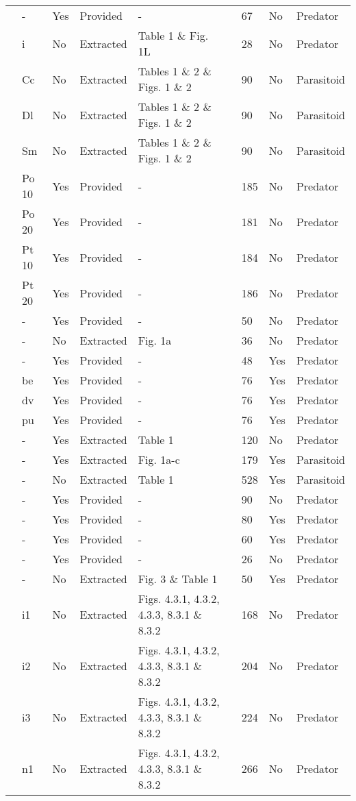 \begin{longtable}{lllllllll}
\citet{Kratina:2009aa}&-&Yes&Provided&-&\citet{Kratina:2020aa}&67&No&Predator\tabularnewline
\citet{Krylov:1992aa}&i&No&Extracted&Table 1 \& Fig. 1L&\citet{Novak:2020aa}&28&No&Predator\tabularnewline
\citet{Kumar:1985aa}&Cc&No&Extracted&Tables 1 \& 2 \& Figs. 1 \& 2&\citet{Novak:2020aa}&90&No&Parasitoid\tabularnewline
\citet{Kumar:1985aa}&Dl&No&Extracted&Tables 1 \& 2 \& Figs. 1 \& 2&\citet{Novak:2020aa}&90&No&Parasitoid\tabularnewline
\citet{Kumar:1985aa}&Sm&No&Extracted&Tables 1 \& 2 \& Figs. 1 \& 2&\citet{Novak:2020aa}&90&No&Parasitoid\tabularnewline
\citet{Lang:2012aa}&Po 10&Yes&Provided&-&\citet{Lang:2020aa}&185&No&Predator\tabularnewline
\citet{Lang:2012aa}&Po 20&Yes&Provided&-&\citet{Lang:2020aa}&181&No&Predator\tabularnewline
\citet{Lang:2012aa}&Pt 10&Yes&Provided&-&\citet{Lang:2020aa}&184&No&Predator\tabularnewline
\citet{Lang:2012aa}&Pt 20&Yes&Provided&-&\citet{Lang:2020aa}&186&No&Predator\tabularnewline
\citet{Long:2012aa}&-&Yes&Provided&-&\citet{Long:2020aa}&50&No&Predator\tabularnewline
\citet{Mansour:1991aa}&-&No&Extracted&Fig. 1a&\citet{Novak:2020aa}&36&No&Predator\tabularnewline
\citet{Medoc:2013aa}&-&Yes&Provided&-&&48&Yes&Predator\tabularnewline
\citet{Medoc:2015aa}&be&Yes&Provided&-&&76&Yes&Predator\tabularnewline
\citet{Medoc:2015aa}&dv&Yes&Provided&-&&76&Yes&Predator\tabularnewline
\citet{Medoc:2015aa}&pu&Yes&Provided&-&&76&Yes&Predator\tabularnewline
\citet{Mertz:1968aa}&-&Yes&Extracted&Table 1&\citet{Novak:2020aa}&120&No&Predator\tabularnewline
\citet{Mills:2004aa}&-&Yes&Extracted&Fig. 1a-c&\citet{Novak:2020aa}&179&Yes&Parasitoid\tabularnewline
\citet{Montoya:2000aa}&-&No&Extracted&Table 1&\citet{Novak:2020aa}&528&Yes&Parasitoid\tabularnewline
\citet{Omkar:2004aa}&-&Yes&Provided&-&&90&No&Predator\tabularnewline
\citet{Prokopenko:2017aa}&-&Yes&Provided&-&\citet{Prokopenko:2020aa}&80&Yes&Predator\tabularnewline
\citet{Pusack:2018aa}&-&Yes&Provided&-&\citet{Pusack:2020aa}&60&Yes&Predator\tabularnewline
\citet{Reeve:1997aa}&-&Yes&Provided&-&\citet{Reeve:2020aa}&26&No&Predator\tabularnewline
\citet{Salt:1974aa}&-&No&Extracted&Fig. 3 \& Table 1&\citet{Novak:2020aa}&50&Yes&Predator\tabularnewline
\citet{Uttley:1980aa}&i1&No&Extracted&Figs. 4.3.1, 4.3.2, 4.3.3, 8.3.1 \& 8.3.2&\citet{Novak:2020aa}&168&No&Predator\tabularnewline
\citet{Uttley:1980aa}&i2&No&Extracted&Figs. 4.3.1, 4.3.2, 4.3.3, 8.3.1 \& 8.3.2&\citet{Novak:2020aa}&204&No&Predator\tabularnewline
\citet{Uttley:1980aa}&i3&No&Extracted&Figs. 4.3.1, 4.3.2, 4.3.3, 8.3.1 \& 8.3.2&\citet{Novak:2020aa}&224&No&Predator\tabularnewline
\citet{Uttley:1980aa}&n1&No&Extracted&Figs. 4.3.1, 4.3.2, 4.3.3, 8.3.1 \& 8.3.2&\citet{Novak:2020aa}&266&No&Predator\tabularnewline

\end{longtable}
